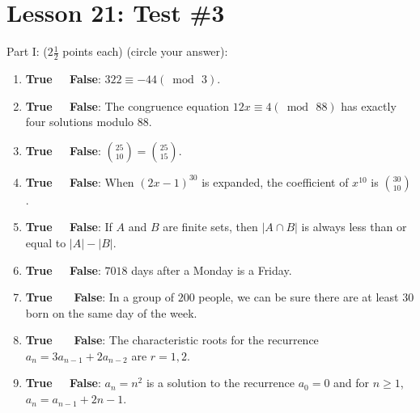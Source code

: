 \documentclass[11pt]{amsart}
\begin{document}
\vfill\break
\section{Lesson 21: Test \#3}

\begin{center}
Part I:  ($2\frac{1}{2}$ points each)  (circle your answer): 
\end{center}
\vskip 10pt


\begin{enumerate}



\item  {\bf {\color{red}True} \ \  False}: $322\equiv -44 (\bmod\,  3 )$.
\vfill

\item  {\bf {\color{red}True} \ \  False}:  The congruence equation $12x \equiv 4 (\bmod\,88)$ has exactly
\vskip -1pt\hskip 80pt four solutions modulo $88$.
\vfill
 
\item  {\bf {\color{red}True }\ \  False}:  $\displaystyle\binom{25}{10} = \binom{25}{15} $.
 
\vfill
  
\item  {\bf True \ \  {\color{red}False}}:  When $(2x-1)^{30}$ is expanded, the coefficient of $x^{10}$ is 
$\displaystyle\binom{30}{10}$.

\vfill

\item  {\bf True \ \ {\color{red}False}}:   If $A$ and $B$ are finite sets, then $|A\cap B|$ is always less than or equal to $|A|-|B|.$ 
 \vfill
 
\item  {\bf {\color{red}True} \ \  False}:  $7018$ days after a Monday is a Friday.
\vfill
 
\item  {\bf True \ \ {\color{red} False}}: In a group of $200$ people, we can be sure there are at least 
\vskip -1pt\hskip 80pt $30$ born on the same day of the week.

\vfill
 
\item  {\bf True \ \ {\color{red} False}}: The characteristic roots for the recurrence $a_{n} = 3a_{n-1}+2a_{n-2}$
are $r = 1,2$. 
\vfill
  
\item  {\bf {\color{red}True} \ \  False}:  $a_n = n^2$ is a solution to the recurrence $a_0 = 0$ and for $n\geq 1$,
\vskip -1pt\hskip 80pt  $a_n = a_{n-1} + 2n-1$.
 

\end{enumerate}
\end{document}
